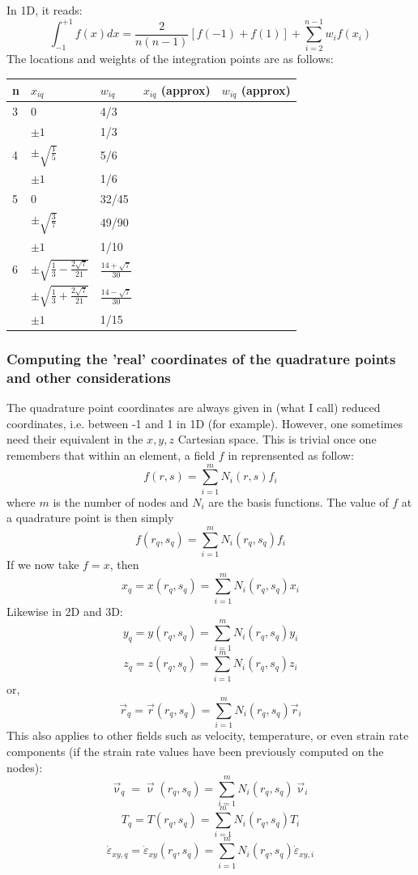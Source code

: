 In 1D, it reads:
\[
\int_{-1}^{+1} f(x) dx = \frac{2}{n(n-1)} [f(-1)+f(1)] + \sum_{i=2}^{n-1} w_i f(x_i) 
\]
The locations and weights of the integration points are as follows:

\begin{center}
\begin{tabular}{lllll}
\hline
n & $x_{iq}$ & $w_{iq}$ & $x_{iq}$ (approx) & $w_{iq}$ (approx) \\
\hline\hline
3 & 0 & 4/3 & & \\
  & $\pm 1$ & 1/3 & &  \\
\hline
4 & $\pm\sqrt{\frac{1}{5}}$ & 5/6 & & \\
  & $\pm 1$ & 1/6 & & \\
\hline
5 & 0 & 32/45 & & \\
  & $\pm\sqrt{\frac{3}{7}}$ & 49/90 & & \\
  & $\pm 1$ & 1/10 & & \\
\hline
6 & $\pm\sqrt{\frac{1}{3} -\frac{2\sqrt{7}}{21}}$ & $\frac{14+\sqrt{7}}{30}$ & & \\
  & $\pm\sqrt{\frac{1}{3} +\frac{2\sqrt{7}}{21}}$ & $\frac{14-\sqrt{7}}{30}$ & & \\
  & $\pm 1$ & 1/15 \\
\hline
\end{tabular}
\end{center}

 
\subsubsection{Computing the 'real' coordinates of the quadrature points and other considerations}

The quadrature point coordinates are always given in (what I call) reduced coordinates, i.e. between 
-1 and 1 in 1D (for example).
However, one sometimes need their equivalent in the $x,y,z$ Cartesian space. 
This is trivial once one remembers that within an element, a field $f$ in reprensented 
as follow:
\[
f(r,s) = \sum_{i=1}^{m} N_{i}(r,s) f_i
\]
where $m$ is the number of nodes and $N_i$ are the basis functions. 
The value of $f$ at a quadrature point is then simply
\[
f(r_q,s_q) = \sum_{i=1}^{m} N_{i}(r_q,s_q) f_i
\]
If we now take $f=x$, then
\[
x_q =x(r_q,s_q) = \sum_{i=1}^{m} N_{i}(r_q,s_q) x_i
\]
Likewise in 2D and 3D:
\[
y_q =y(r_q,s_q) = \sum_{i=1}^{m} N_{i}(r_q,s_q) y_i
\]
\[
z_q =z(r_q,s_q) = \sum_{i=1}^{m} N_{i}(r_q,s_q) z_i
\]
or, 
\[
\vec{r}_q =\vec{r}(r_q,s_q) = \sum_{i=1}^{m} N_{i}(r_q,s_q) \vec{r}_i
\]
This also applies to other fields such as velocity, temperature, or even strain rate components 
(if the strain rate values have been previously computed on the nodes): 
\[
\vec{\upnu}_q =\vec{\upnu}(r_q,s_q) = \sum_{i=1}^{m} N_{i}(r_q,s_q) \vec{\upnu}_i
\]
\[
T_q =T(r_q,s_q) = \sum_{i=1}^{m} N_{i}(r_q,s_q) T_i
\]
\[
\dot{\varepsilon}_{xy,q} =   \dot{\varepsilon}_{xy} (r_q,s_q) = \sum_{i=1}^{m} N_{i}(r_q,s_q)  \dot{\varepsilon}_{xy,i}
\]













